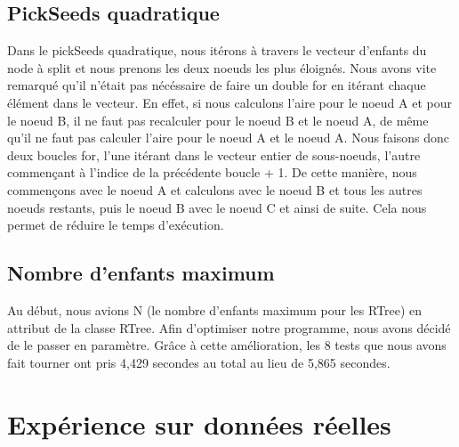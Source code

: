 \documentclass[utf8]{article}
\begin{document}
\begin{large}
    \subsection{PickSeeds quadratique}
    \indent
    \par
    Dans le pickSeeds quadratique, nous itérons à travers le vecteur d'enfants du node à
    split et nous prenons les deux noeuds les plus éloignés. Nous avons vite
    remarqué qu'il n'était pas nécéssaire de faire un double for en itérant chaque
    élément dans le vecteur. En effet, si nous calculons l'aire pour le noeud A
    et pour le noeud B, il ne faut pas recalculer pour le noeud B et le noeud A, de
    même qu'il ne faut pas calculer l'aire pour le noeud A et le noeud A. Nous
    faisons donc deux boucles for, l'une itérant dans le vecteur entier de
    sous-noeuds, l'autre commençant à l'indice de la précédente boucle + 1. De cette
    manière, nous commençons avec le noeud A et calculons avec le noeud B et tous
    les autres noeuds restants, puis le noeud B avec le noeud C et ainsi de suite. Cela nous permet de réduire le temps d'exécution.

    \subsection{Nombre d'enfants maximum}
    \indent
    \par
    Au début, nous avions N (le nombre d'enfants maximum pour les RTree) en
    attribut de la classe RTree. Afin d'optimiser notre programme, nous avons
    décidé de le passer en paramètre. Grâce à cette amélioration, les 8 tests que
    nous avons fait tourner ont pris 4,429 secondes au total au lieu de 5,865
    secondes.


    \section{Expérience sur données réelles}

\end{large}
\end{document}
